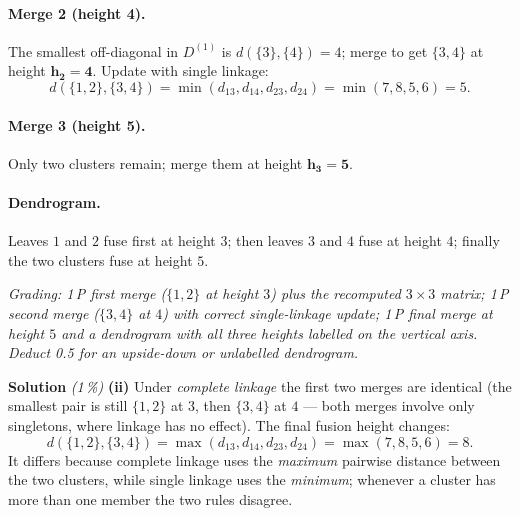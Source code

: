 \documentclass[11pt,a4paper]{article}
\newcommand{\subpoints}[1]{\textit{(#1\,\%)}}
\newcommand{\sol}{\noindent\textbf{Solution}}
\begin{document}
\paragraph{Merge 2 (height 4).} The smallest off-diagonal in $D^{(1)}$ is $d(\{3\},\{4\})=4$;
merge to get $\{3,4\}$ at height $\mathbf{h_2=4}$. Update with single linkage:
$$d(\{1,2\},\{3,4\}) = \min(d_{13},d_{14},d_{23},d_{24}) = \min(7,8,5,6) = 5.$$

\paragraph{Merge 3 (height 5).} Only two clusters remain; merge them at height $\mathbf{h_3=5}$.

\paragraph{Dendrogram.} Leaves $1$ and $2$ fuse first at height $3$; then leaves $3$ and $4$ fuse
at height $4$; finally the two clusters fuse at height $5$.
\begin{center}
\end{center}

\noindent\emph{Grading: 1\,P first merge ($\{1,2\}$ at height $3$) plus the recomputed
$3\times 3$ matrix; 1\,P second merge ($\{3,4\}$ at $4$) with correct single-linkage update;
1\,P final merge at height $5$ and a dendrogram with all three heights labelled on the vertical
axis. Deduct 0.5 for an upside-down or unlabelled dendrogram.}

\medskip
\sol{} \subpoints{1} \textbf{(ii)} Under \emph{complete linkage} the first two merges are
identical (the smallest pair is still $\{1,2\}$ at $3$, then $\{3,4\}$ at $4$ --- both merges
involve only singletons, where linkage has no effect). The final fusion height changes:
$$d(\{1,2\},\{3,4\}) = \max(d_{13},d_{14},d_{23},d_{24}) = \max(7,8,5,6) = \boxed{8}.$$
It differs because complete linkage uses the \emph{maximum} pairwise distance between the two
clusters, while single linkage uses the \emph{minimum}; whenever a cluster has more than one
member the two rules disagree.
\end{document}
